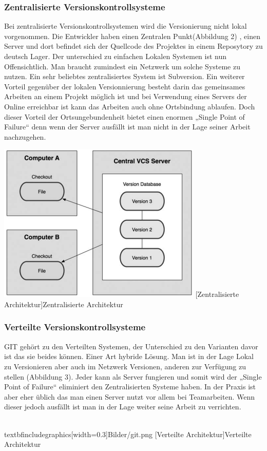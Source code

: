 \documentclass[12pt,a4paper,bibliography=totocnumbered,listof=totocnumbered]{scrartcl}
\begin{document}
\subsubsection{Zentralisierte Versionskontrollsysteme}
Bei zentralisierte Versionskontrollsystemen wird die Versionierung nicht lokal vorgenommen. Die Entwickler haben einen Zentralen Punkt(Abbildung 2) , einen Server und dort befindet sich der Quellcode des Projektes in einem Reposytory zu deutsch Lager. Der unterschied zu einfachen Lokalen Systemen ist nun Offensichtlich. Man braucht zumindest ein Netzwerk um solche Systeme zu nutzen. Ein sehr beliebtes zentralisiertes System ist Subversion. Ein weiterer Vorteil gegenüber der lokalen Versionnierung besteht darin das gemeinsames Arbeiten an einem Projekt möglich ist und bei Verwendung eines Servers der Online erreichbar ist kann das Arbeiten auch ohne Ortsbindung ablaufen. Doch dieser Vorteil der Ortsungebundenheit bietet einen enormen „Single Point of Failure“ denn wenn der Server ausfällt ist man nicht in der Lage seiner Arbeit nachzugehen.

\newline
\vspace{3pt}
\begin{minipage}{\linewidth}
	\centering
	\includegraphics[width=0.3\linewidth]{Bilder/sub.png}
	[Zentralisierte Architektur]{Zentralisierte Architektur\footnotemark }
	\label{fig:osgi}
\end{minipage} 	

\subsubsection{Verteilte Versionskontrollsysteme}
GIT gehört zu den Verteilten Systemen, der Unterschied zu den Varianten davor ist das sie beides können. 
Einer Art hybride Lösung. Man ist in der Lage Lokal zu Versionieren aber auch im Netzwerk Versionen, anderen zur Verfügung zu stellen (Abbildung 3). Jeder kann als Server fungieren und somit  wird der „Single Point of Failure“ eliminiert den Zentralisierten Systeme haben. In der Praxis ist aber eher üblich das man einen Server nutzt vor allem bei Teamarbeiten. Wenn dieser jedoch ausfällt ist man in der Lage weiter seine Arbeit zu verrichten.
\newline
\vspace{3pt}
\begin{minipage}{\linewidth}
	\centering
	\\textbf{includegraphics[width=0.3\linewidth]{Bilder/git.png}}
	[Verteilte Architektur]{Verteilte Architektur\footnotemark }
	\label{fig:osgi}
\end{minipage}
   
\end{document}
